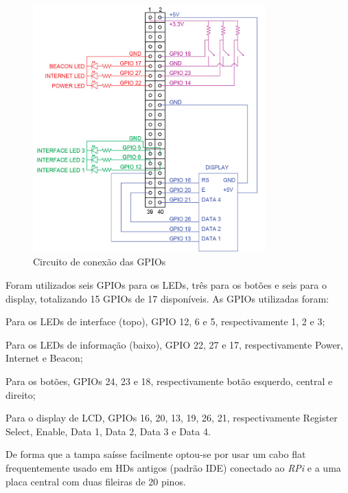 \begin{figure}[htb]
	\caption{\label{fig:pinout-gpio}Circuito de conexão das GPIOs}
	\begin{center}
		\includegraphics[width=0.8\textwidth]{img/pinout-gpio.jpg}
	\end{center}
\end{figure}

Foram utilizados seis GPIOs para os LEDs, três para os botões e seis para o display, totalizando 15 GPIOs de 17 disponíveis. As GPIOs utilizadas foram:

\begin{alineas}
	\item Para os LEDs de interface (topo), GPIO 12, 6 e 5, respectivamente 1, 2 e 3;
	\item Para os LEDs de informação (baixo), GPIO 22, 27 e 17, respectivamente Power, Internet e Beacon;
	\item Para os botões, GPIOs 24, 23 e 18, respectivamente botão esquerdo, central e direito;
	\item Para o display de LCD, GPIOs 16, 20, 13, 19, 26, 21, respectivamente Register Select, Enable, Data 1, Data 2, Data 3 e Data 4.
\end{alineas}

De forma que a tampa saísse facilmente optou-se por usar um cabo flat frequentemente usado em HDs antigos (padrão IDE) conectado ao \textit{RPi} e a uma placa central com duas fileiras de 20 pinos.

